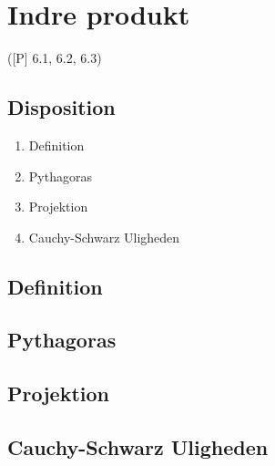 \newpage
\chapter{Indre produkt}
([P] 6.1, 6.2, 6.3)

\section*{Disposition}
\begin{enumerate}
	\item Definition
	\item Pythagoras
	\item Projektion
	\item Cauchy-Schwarz Uligheden
\end{enumerate}

\section{Definition}


\section{Pythagoras}


\section{Projektion}


\section{Cauchy-Schwarz Uligheden}

